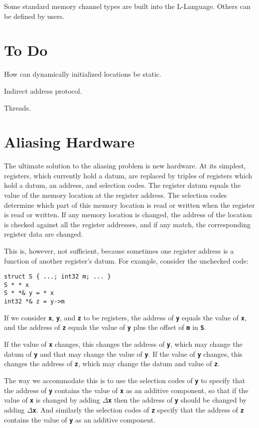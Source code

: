 \documentclass[12pt]{article}
\newcommand{\TT}[1]{{\tt \bfseries #1}}
\newenvironment{indpar}[1][0.3in]%
	{\begin{list}{}%
		     {\setlength{\itemsep}{0in}%
		      \setlength{\topsep}{0in}%
		      \setlength{\parsep}{1ex}%
		      \setlength{\labelwidth}{#1}%
		      \setlength{\leftmargin}{#1}%
		      \addtolength{\leftmargin}{\labelsep}}%
	 \item}%
	{\end{list}}
\begin{document}
Some standard memory channel types are built into the L-Language.
Others can be defined by users.

\section{To Do}

How can dynamically initialized locations be static.

Indirect address protocol.
\label{INDIRECT-ADDRESS-PROTOCOL}

Threads.
\label{THREADS}

\appendix

\section{Aliasing Hardware}
\label{ALIASING-HARDWARE}

The ultimate solution to the aliasing problem is new hardware.
At its simplest, registers, which currently hold a datum,
are replaced by triples of registers which hold a datum,
an address, and selection codes.  The register datum equals the value
of the memory location at the register address.  The selection
codes determine which part of this memory location is read or written
when the register is read or written.  If any memory location is
changed, the address of the location is checked against all the
register addresses, and if any match, the corresponding register
data are changed.

This is, however, not sufficient, because sometimes one register
address is a function of another register's datum.  For example,
consider the unchecked code:
\begin{indpar}[0.5em]\begin{verbatim}
struct S { ...; int32 m; ... }
S * * x
S * *& y = * x
int32 *& z = y->m
\end{verbatim}\end{indpar}
If we consider \TT{x}, \TT{y}, and \TT{z} to be registers,
the address of \TT{y} equals the value of \TT{x}, and the
address of \TT{z} equals the value of \TT{y} plus the offset of
\TT{m} in \TT{S}.

If the value of \TT{x} changes, this changes the address of \TT{y},
which may change the datum of \TT{y} and that may change the value
of \TT{y}.  If the value of \TT{y} changes, this changes the address
of \TT{z}, which may change the datum and value of \TT{z}.

The way we accommodate this is to use the selection codes of \TT{y}
to specify that the address of \TT{y} contains the value of \TT{x}
as an additive component, so
that if the value of \TT{x} is changed by adding $\Delta$\TT{x}
then the address of \TT{y} should be changed by adding $\Delta$\TT{x}.
And similarly the selection codes
of \TT{z} specify that the address of \TT{z}
contains the value of \TT{y} as an additive component.
\end{document}
